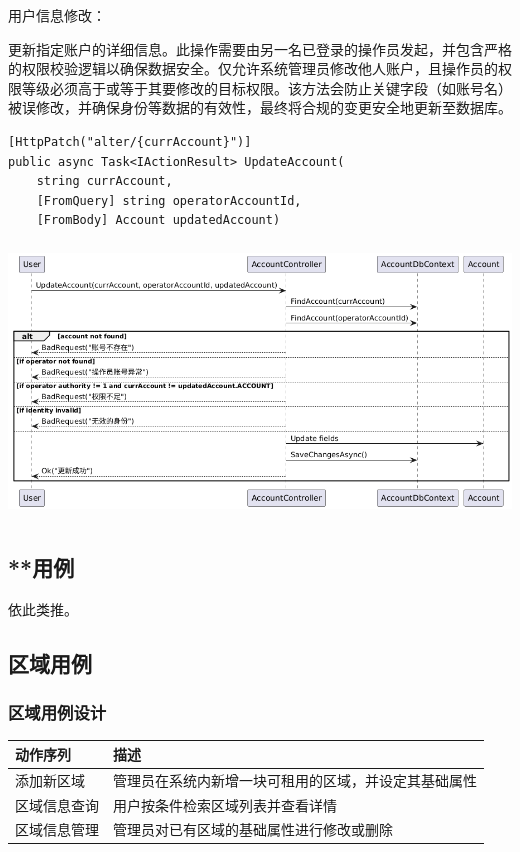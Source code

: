 \documentclass[]{article}
\begin{document}
用户信息修改：

更新指定账户的详细信息。此操作需要由另一名已登录的操作员发起，并包含严格的权限校验逻辑以确保数据安全。仅允许系统管理员修改他人账户，且操作员的权限等级必须高于或等于其要修改的目标权限。该方法会防止关键字段（如账号名）被误修改，并确保身份等数据的有效性，最终将合规的变更安全地更新至数据库。
\begin{verbatim}
[HttpPatch("alter/{currAccount}")]
public async Task<IActionResult> UpdateAccount(
    string currAccount,
    [FromQuery] string operatorAccountId,
    [FromBody] Account updatedAccount)
\end{verbatim}

\includegraphics[width=5.64167in,height=2.86458in]{media/media/image7.png}

\hypertarget{ux7528ux4f8b}{%
  \subsection{**用例}\label{ux7528ux4f8b}}

依此类推。

\hypertarget{ux7528ux4f8b-1}{%
  \subsection{区域用例}\label{ux7528ux4f8b-1}}
\hypertarget{ux7528ux4f8b-1ux8bbeux8ba1}{%
  \subsubsection{区域用例设计}\label{ux7528ux4f8b-1ux8bbeux8ba1}}


\begin{longtable}[]{@{}ll@{}}
  \toprule
  \textbf{动作序列} & \textbf{描述}                \\
  \midrule
  \endhead
  添加新区域         & 管理员在系统内新增一块可租用的区域，并设定其基础属性 \\
  区域信息查询        & 用户按条件检索区域列表并查看详情           \\
  区域信息管理        & 管理员对已有区域的基础属性进行修改或删除       \\
  \bottomrule
\end{longtable}
\end{document}
